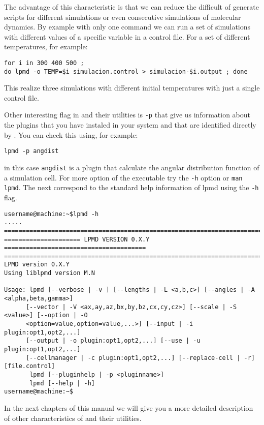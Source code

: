 The advantage of this characteristic is that we can reduce the difficult of
generate scripts for different simulations or even consecutive simulations of
molecular dynamics. By example with only one command we can run a set of
simulations with different values of a specific variable in a control file. For
a set of different temperatures, for example:

\begin{center}
 \texttt{for i in 300 400 500 ; \\do lpmd -o TEMP=\$i simulacion.control > simulacion-\$i.output ; done}
\end{center}
\noindent
This realize three simulations with different initial temperatures with just a
single control file.

Other interesting flag in {\lpmd} and their utilities is \verb|-p| that give
us information about the plugins that you have instaled in your system and that
are identified directly by {\lpmd}. You can check this using, for example:

\begin{center}
 \texttt{lpmd -p angdist}
\end{center}
\noindent
in this case \verb|angdist| is a plugin that calculate the angular distribution
function of a simulation cell. For more option of the executable try the
\verb|-h| option or \verb|man lpmd|. The next correspond to the standard help
information of lpmd using the \verb|-h| flag.

\begin{verbatim}
username@machine:~$lpmd -h
.....
================================================================================
===================== LPMD VERSION 0.X.Y =======================================
================================================================================
LPMD version 0.X.Y
Using liblpmd version M.N

Usage: lpmd [--verbose | -v ] [--lengths | -L <a,b,c>] [--angles | -A <alpha,beta,gamma>]
      [--vector | -V <ax,ay,az,bx,by,bz,cx,cy,cz>] [--scale | -S <value>] [--option | -O
      <option=value,option=value,...>] [--input | -i plugin:opt1,opt2,...]  
      [--output | -o plugin:opt1,opt2,...] [--use | -u plugin:opt1,opt2,...] 
      [--cellmanager | -c plugin:opt1,opt2,...] [--replace-cell | -r] [file.control]
       lpmd [--pluginhelp | -p <pluginname>]
       lpmd [--help | -h]
username@machine:~$ 
\end{verbatim}

In the next chapters of this manual we will give you a more detailed description
of other characteristics of {\lpmd} and their utilities.

